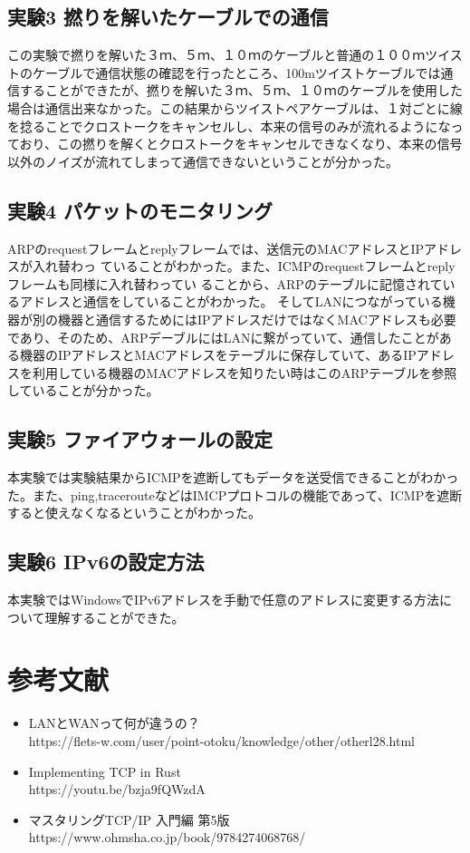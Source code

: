 \documentclass[10pt]{article}
\begin{document}
\subsection{実験3 撚りを解いたケーブルでの通信 }
この実験で撚りを解いた３ｍ、５ｍ、１０ｍのケーブルと普通の１００ｍツイストのケーブルで通信状態の確認を行ったところ、100mツイストケーブルでは通信することができたが、撚りを解いた３ｍ、５ｍ、１０ｍのケーブルを使用した場合は通信出来なかった。この結果からツイストペアケーブルは、１対ごとに線を捻ることでクロストークをキャンセルし、本来の信号のみが流れるようになっており、この撚りを解くとクロストークをキャンセルできなくなり、本来の信号以外のノイズが流れてしまって通信できないということが分かった。

\subsection{実験4 パケットのモニタリング}
ARPのrequestフレームとreplyフレームでは、送信元のMACアドレスとIPアドレスが入れ替わっ
ていることがわかった。また、ICMPのrequestフレームとreplyフレームも同様に入れ替わってい
ることから、ARPのテーブルに記憶されているアドレスと通信をしていることがわかった。
そしてLANにつながっている機器が別の機器と通信するためにはIPアドレスだけではなくMACアドレスも必要であり、そのため、ARPデーブルにはLANに繋がっていて、通信したことがある機器のIPアドレスとMACアドレスをテーブルに保存していて、あるIPアドレスを利用している機器のMACアドレスを知りたい時はこのARPテーブルを参照していることが分かった。

\subsection{実験5 ファイアウォールの設定 }
本実験では実験結果からICMPを遮断してもデータを送受信できることがわかった。また、ping,tracerouteなどはIMCPプロトコルの機能であって、ICMPを遮断すると使えなくなるということがわかった。

\subsection{実験6 IPv6の設定方法}
 本実験ではWindowsでIPv6アドレスを手動で任意のアドレスに変更する方法について理解することができた。
 
 \section{参考文献}
 \begin{itemize}
    \item LANとWANって何が違うの？\\
         https://flets-w.com/user/point-otoku/knowledge/other/otherl28.html
    \item Implementing TCP in Rust \\
        https://youtu.be/bzja9fQWzdA
    \item マスタリングTCP/IP 入門編 第5版 \\
        https://www.ohmsha.co.jp/book/9784274068768/
 
 \end{itemize}
 
\end{document}
